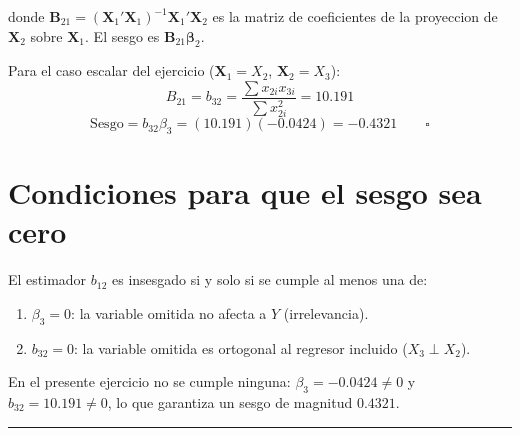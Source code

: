 \documentclass[12pt, letterpaper]{article}
\theoremstyle{remark}
\begin{document}
\noindent donde $\mathbf{B}_{21} = (\mathbf{X}_1'\mathbf{X}_1)^{-1}\mathbf{X}_1'\mathbf{X}_2$
es la matriz de coeficientes de la proyeccion de $\mathbf{X}_2$ sobre $\mathbf{X}_1$.
El sesgo es $\mathbf{B}_{21}\boldsymbol{\beta}_2$.

Para el caso escalar del ejercicio ($\mathbf{X}_1 = X_2$, $\mathbf{X}_2 = X_3$):
\begin{equation}
  B_{21} = b_{32} = \frac{\sum x_{2i} x_{3i}}{\sum x_{2i}^2} = 10.191
\end{equation}
\begin{equation}
  \text{Sesgo} = b_{32}\beta_3 = (10.191)(-0.0424) = -0.4321 \qquad \square
\end{equation}

\section{Condiciones para que el sesgo sea cero}

El estimador $b_{12}$ es insesgado si y solo si se cumple al menos una de:

\begin{enumerate}[leftmargin=1.8em, itemsep=4pt]
  \item $\beta_3 = 0$: la variable omitida no afecta a $Y$ (irrelevancia).
  \item $b_{32} = 0$: la variable omitida es ortogonal al regresor incluido
    ($X_3 \perp X_2$).
\end{enumerate}

En el presente ejercicio no se cumple ninguna: $\beta_3 = -0.0424 \neq 0$ y
$b_{32} = 10.191 \neq 0$, lo que garantiza un sesgo de magnitud $0.4321$.

\vspace{14pt}
\noindent\rule{\linewidth}{0.4pt}

\end{document}
